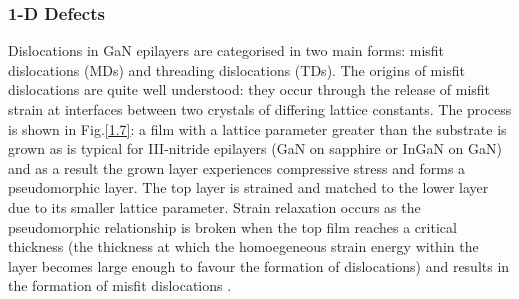\subsubsection{1-D Defects}
\label{dislocation section}
Dislocations in GaN epilayers are categorised in two main forms: misfit dislocations (MDs) and threading dislocations (TDs). The origins of misfit dislocations are quite well understood: they occur through the release of misfit strain at interfaces between two crystals of differing lattice constants. The process is shown in Fig.\ref{1.7}: a film with a lattice parameter greater than the substrate is grown as is typical for III-nitride epilayers (GaN on sapphire or InGaN on GaN) and as a result the grown layer experiences compressive stress and forms a pseudomorphic layer. The top layer is strained and matched to the lower layer due to its smaller lattice parameter. Strain relaxation occurs as the pseudomorphic relationship is broken when the top film reaches a critical thickness (the thickness at which the homoegeneous strain energy within the layer becomes large enough to favour the formation of dislocations) and results in the formation of misfit dislocations \cite{Peeople1985}.

